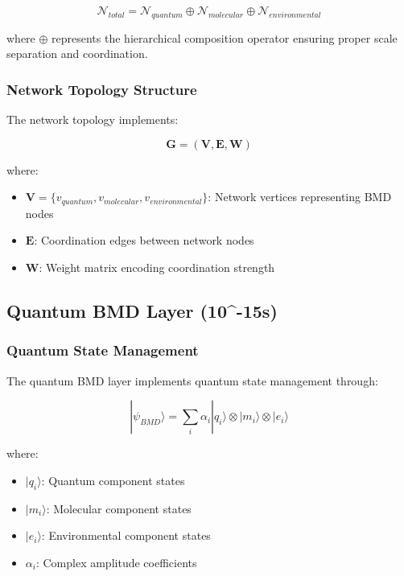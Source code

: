 \begin{equation}
\mathcal{N}_{total} = \mathcal{N}_{quantum} \oplus \mathcal{N}_{molecular} \oplus \mathcal{N}_{environmental}
\end{equation}

where $\oplus$ represents the hierarchical composition operator ensuring proper scale separation and coordination.

\subsubsection{Network Topology Structure}

The network topology implements:

\begin{equation}
\mathbf{G} = (\mathbf{V}, \mathbf{E}, \mathbf{W})
\end{equation}

where:
\begin{itemize}
\item $\mathbf{V} = \{v_{quantum}, v_{molecular}, v_{environmental}\}$: Network vertices representing BMD nodes
\item $\mathbf{E}$: Coordination edges between network nodes
\item $\mathbf{W}$: Weight matrix encoding coordination strength
\end{itemize}

\subsection{Quantum BMD Layer (10^{-15}s)}

\subsubsection{Quantum State Management}

The quantum BMD layer implements quantum state management through:

\begin{equation}
|\psi_{BMD}\rangle = \sum_{i} \alpha_i |q_i\rangle \otimes |m_i\rangle \otimes |e_i\rangle
\end{equation}

where:
\begin{itemize}
\item $|q_i\rangle$: Quantum component states
\item $|m_i\rangle$: Molecular component states  
\item $|e_i\rangle$: Environmental component states
\item $\alpha_i$: Complex amplitude coefficients
\end{itemize}

